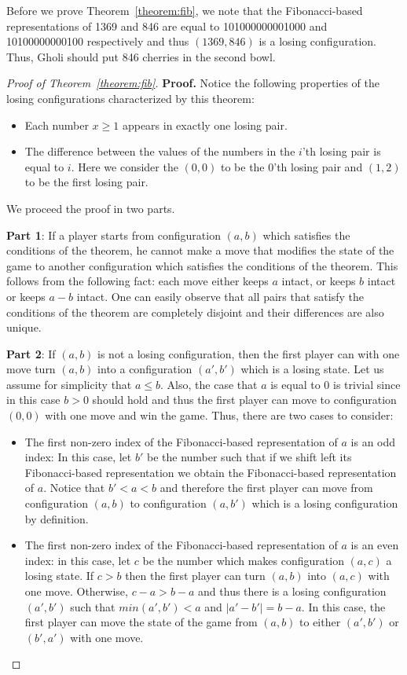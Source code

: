 \begin{solution}
Before we prove Theorem~\ref{theorem:fib}, we note that the Fibonacci-based representations of 1369 and 846 are equal to 101000000001000 and 10100000000100 respectively and thus $(1369,846)$ is a losing configuration. Thus, Gholi should put 846 cherries in the second bowl.

\begin{proof}[Proof of Theorem~\ref{theorem:fib}]
\textbf{Proof. }
	Notice the following properties of the losing configurations characterized by this theorem:
	\begin{itemize}
		\item Each number $x \geq 1$ appears in exactly one losing pair.
		\item The difference between the values of the numbers in the $i$'th losing pair is equal to $i$. Here we consider the $(0,0)$ to be the 0'th losing pair and $(1,2)$ to be the first losing pair.
	\end{itemize}
	
	We proceed the proof in two parts.
	
	\textbf{Part 1}: If a player starts from configuration $(a, b)$ which satisfies the conditions of the theorem, he cannot make a move that modifies the state of the game to another configuration which satisfies the conditions of the theorem. This follows from the following fact: each move either keeps $a$ intact, or keeps $b$ intact or keeps $a-b$ intact. One can easily observe that all pairs that satisfy the conditions of the theorem are completely disjoint and their differences are also unique.
	
	\textbf{Part 2}: If $(a,b)$ is not a losing configuration, then the first player can with one move turn $(a,b)$ into a configuration $(a',b')$ which is a losing state. Let us assume for simplicity that $a \leq b$. Also, the case that $a$ is equal to 0 is trivial since in this case $b > 0$ should hold and thus the first player can move to configuration $(0,0)$ with one move and win the game. Thus, there are two cases to consider:
	\begin{itemize}
		\item The first non-zero index of the Fibonacci-based representation of $a$ is an odd index: In this case, let $b'$ be the number such that if we shift left its Fibonacci-based representation we obtain the Fibonacci-based representation of $a$. Notice that $b' < a < b$ and therefore the first player can move from configuration $(a,b)$ to configuration $(a,b')$ which is a losing configuration by definition.
		\item The first non-zero index of the Fibonacci-based representation of $a$ is an even index: in this case, let $c$ be the number which makes configuration $(a,c)$ a losing state. If $c > b$ then the first player can turn $(a,b)$ into $(a,c)$ with one move. Otherwise, $c-a > b-a$ and thus there is a losing configuration $(a',b')$ such that $min(a',b') < a$ and $|a'-b'| = b-a$. In this case, the first player can move the state of the game from $(a,b)$ to either $(a',b')$ or $(b',a')$ with one move.
	\end{itemize}
	
\end{proof}
\end{solution}
